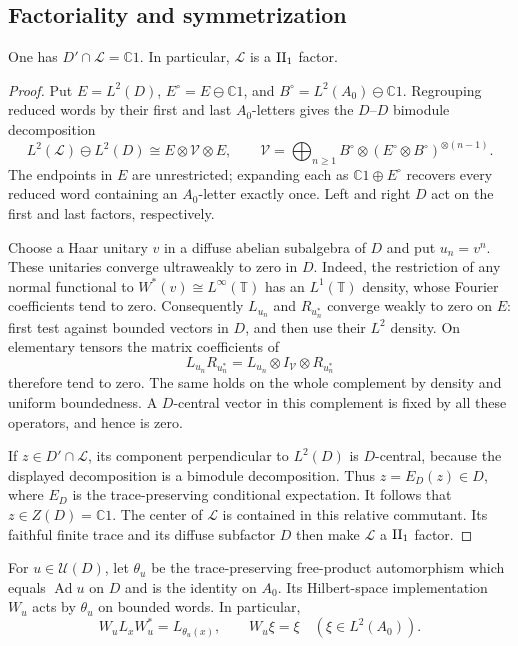 \subsection{Factoriality and symmetrization}

\begin{lemma}\label{lem:free-factor}
One has $D'\cap\mathcal L=\mathbb C1$.  In particular, $\mathcal L$ is a
${\rm II}_1$ factor.
\end{lemma}

\begin{proof}
Put $E=L^2(D)$, $E^\circ=E\ominus\mathbb C1$, and
$B^\circ=L^2(A_0)\ominus\mathbb C1$.  Regrouping reduced words by their
first and last $A_0$-letters gives the $D$--$D$ bimodule decomposition
\[
 L^2(\mathcal L)\ominus L^2(D)
 \cong E\otimes\mathcal V\otimes E,
 \qquad
 \mathcal V=
 \bigoplus_{n\geq1}
 B^\circ\otimes(E^\circ\otimes B^\circ)^{\otimes(n-1)}.
\]
The endpoints in $E$ are unrestricted; expanding each as
$\mathbb C1\oplus E^\circ$ recovers every reduced word containing an
$A_0$-letter exactly once.  Left and right $D$ act on the first and last
factors, respectively.

Choose a Haar unitary $v$ in a diffuse abelian subalgebra of $D$ and put
$u_n=v^n$.  These unitaries converge ultraweakly to zero in $D$.
Indeed, the restriction of any normal functional to
$W^*(v)\cong L^\infty(\mathbb T)$ has an $L^1(\mathbb T)$ density,
whose Fourier coefficients tend to zero.  Consequently
$L_{u_n}$ and $R_{u_n^*}$ converge weakly to zero on $E$: first test
against bounded vectors in $D$, and then use their $L^2$ density.
On elementary tensors the matrix coefficients of
\[
 L_{u_n}R_{u_n^*}
  =L_{u_n}\otimes I_{\mathcal V}\otimes R_{u_n^*}
\]
therefore tend to zero.  The same holds on the whole complement by
density and uniform boundedness.  A $D$-central vector in this
complement is fixed by all these operators, and hence is zero.

If $z\in D'\cap\mathcal L$, its component perpendicular to $L^2(D)$
is $D$-central, because the displayed decomposition is a bimodule
decomposition.  Thus $z=E_D(z)\in D$, where $E_D$ is the
trace-preserving conditional expectation.  It follows that
$z\in Z(D)=\mathbb C1$.  The center of $\mathcal L$ is contained in
this relative commutant.  Its faithful finite trace and its diffuse
subfactor $D$ then make $\mathcal L$ a ${\rm II}_1$ factor.
\end{proof}

For $u\in\mathcal U(D)$, let $\theta_u$ be the trace-preserving
free-product automorphism which equals $\operatorname{Ad}u$ on $D$
and is the identity on $A_0$.  Its Hilbert-space implementation $W_u$
acts by $\theta_u$ on bounded words.  In particular,
\[
 W_uL_xW_u^*=L_{\theta_u(x)},\qquad
 W_u\xi=\xi\quad(\xi\in L^2(A_0)).
\]

